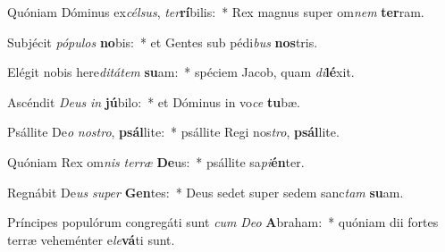 \item Quóniam Dóminus ex\textit{cél}\textit{sus}, \textit{ter}\textbf{rí}bilis:~* Rex magnus super om\textit{nem} \textbf{ter}ram.
\item Subjécit \textit{pó}\textit{pu}\textit{los} \textbf{no}bis:~* et Gentes sub pédi\textit{bus} \textbf{nos}tris.
\item Elégit nobis here\textit{di}\textit{tá}\textit{tem} \textbf{su}am:~* spéciem Jacob, quam \textit{di}\textbf{lé}xit.
\item Ascéndit \textit{De}\textit{us} \textit{in} \textbf{jú}bilo:~* et Dóminus in vo\textit{ce} \textbf{tu}bæ.
\item Psállite De\textit{o} \textit{nos}\textit{tro}, \textbf{psál}lite:~* psállite Regi nos\textit{tro}, \textbf{psál}lite.
\item Quóniam Rex om\textit{nis} \textit{ter}\textit{ræ} \textbf{De}us:~* psállite sa\textit{pi}\textbf{én}ter.
\item Regnábit De\textit{us} \textit{su}\textit{per} \textbf{Gen}tes:~* Deus sedet super sedem sanc\textit{tam} \textbf{su}am.
\item Príncipes populórum congregáti sunt \textit{cum} \textit{De}\textit{o} \textbf{A}braham:~* quóniam dii fortes terræ veheménter e\textit{le}\textbf{vá}ti sunt.
